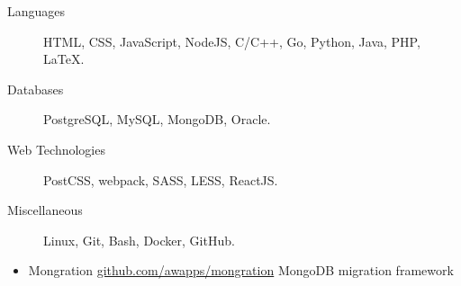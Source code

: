 \documentclass[letterpaper,11pt]{article}
\begin{document}
    \begin{description}
        \item[Languages]
            HTML, CSS, JavaScript, NodeJS, C/C++, Go, Python, Java, PHP, \LaTeX.
        \item[Databases]
            PostgreSQL, MySQL, MongoDB, Oracle.
        \item[Web Technologies]
            PostCSS, webpack, SASS, LESS, ReactJS.
        \item[Miscellaneous]
            Linux, Git, Bash, Docker, GitHub.
    \end{description}

    \begin{itemize}
        \item
            \ressubheading
                {Mongration}
                {\href{https://github.com/awapps/mongration}{github.com/awapps/mongration}}
                {MongoDB migration framework}
                {}
    \end{itemize}
\end{document}
